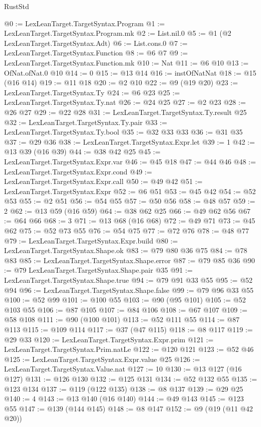\begin{lexlean}{RustStd}
\begin{coremodule}
{\begin{coremodule}
{{{{{{{{{@0 := LexLeanTarget.TargetSyntax.Program
@1 := LexLeanTarget.TargetSyntax.Program.mk
@2 := List.nil.{0}
@5 := @1 (@2 LexLeanTarget.TargetSyntax.Adt)
@6 := List.cons.{0}
@7 := LexLeanTarget.TargetSyntax.Function
@8 := @6 @7
@9 := LexLeanTarget.TargetSyntax.Function.mk
@10 := Nat
@11 := @6 @10
@13 := OfNat.ofNat.{0} @10
@14 := 0
@15 := @13 @14
@16 := instOfNatNat
@18 := @15 (@16 @14)
@19 := @11 @18
@20 := @2 @10
@22 := @9 (@19 @20)
@23 := LexLeanTarget.TargetSyntax.Ty
@24 := @6 @23
@25 := LexLeanTarget.TargetSyntax.Ty.nat
@26 := @24 @25
@27 := @2 @23
@28 := @26 @27
@29 := @22 @28
@31 := LexLeanTarget.TargetSyntax.Ty.result @25
@32 := LexLeanTarget.TargetSyntax.Ty.pair
@33 := LexLeanTarget.TargetSyntax.Ty.bool
@35 := @32 @33 @33
@36 := @31 @35
@37 := @29 @36
@38 := LexLeanTarget.TargetSyntax.Expr.let
@39 := 1
@42 := @13 @39 (@16 @39)
@44 := @38 @42 @25
@45 := LexLeanTarget.TargetSyntax.Expr.var
@46 := @45 @18
@47 := @44 @46
@48 := LexLeanTarget.TargetSyntax.Expr.cond
@49 := LexLeanTarget.TargetSyntax.Expr.call
@50 := @49 @42
@51 := LexLeanTarget.TargetSyntax.Expr
@52 := @6 @51
@53 := @45 @42
@54 := @52 @53
@55 := @2 @51
@56 := @54 @55
@57 := @50 @56
@58 := @48 @57
@59 := 2
@62 := @13 @59 (@16 @59)
@64 := @38 @62 @25
@66 := @49 @62 @56
@67 := @64 @66
@68 := 3
@71 := @13 @68 (@16 @68)
@72 := @49 @71
@73 := @45 @62
@75 := @52 @73 @55
@76 := @54 @75
@77 := @72 @76
@78 := @48 @77
@79 := LexLeanTarget.TargetSyntax.Expr.build
@80 := LexLeanTarget.TargetSyntax.Shape.ok
@83 := @79 @80 @36 @75
@84 := @78 @83
@85 := LexLeanTarget.TargetSyntax.Shape.error
@87 := @79 @85 @36
@90 := @79 LexLeanTarget.TargetSyntax.Shape.pair @35
@91 := LexLeanTarget.TargetSyntax.Shape.true
@94 := @79 @91 @33 @55
@95 := @52 @94
@96 := LexLeanTarget.TargetSyntax.Shape.false
@99 := @79 @96 @33 @55
@100 := @52 @99
@101 := @100 @55
@103 := @90 (@95 @101)
@105 := @52 @103 @55
@106 := @87 @105
@107 := @84 @106
@108 := @67 @107
@109 := @58 @108
@111 := @90 (@100 @101)
@113 := @52 @111 @55
@114 := @87 @113
@115 := @109 @114
@117 := @37 (@47 @115)
@118 := @8 @117
@119 := @29 @33
@120 := LexLeanTarget.TargetSyntax.Expr.prim
@121 := LexLeanTarget.TargetSyntax.Prim.natLe
@122 := @120 @121
@123 := @52 @46
@125 := LexLeanTarget.TargetSyntax.Expr.value @25
@126 := LexLeanTarget.TargetSyntax.Value.nat
@127 := 10
@130 := @13 @127 (@16 @127)
@131 := @126 @130
@132 := @125 @131
@134 := @52 @132 @55
@135 := @123 @134
@137 := @119 (@122 @135)
@138 := @8 @137
@139 := @29 @25
@140 := 4
@143 := @13 @140 (@16 @140)
@144 := @49 @143
@145 := @123 @55
@147 := @139 (@144 @145)
@148 := @8 @147
@152 := @9 (@19 (@11 @42 @20))
}}}}}}}}}
\end{coremodule}}
\end{coremodule}
\end{lexlean}
